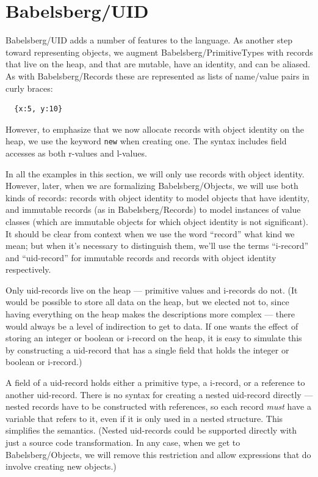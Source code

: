 \documentclass{article}
\newcommand{\Cuid}{\texttt{\upshape C}}
\newcommand{\Iuid}{\texttt{\upshape I}}
\newcommand{\Ccal}{$\mathbb{C}$}
\newcommand{\Ical}{$\mathbb{I}$}
\newcommand{\C}{\Ccal}
\renewcommand{\C}{\Ccal}
\newcommand{\I}{\Ical}
\newcounter{examples}
\begin{document}
\section{Babelsberg/UID}
\label{sec:babelsberg-uid}
\renewcommand{\C}{\Cuid}
\renewcommand{\I}{\Iuid}

Babelsberg/UID adds a number of features to the language. As another step
toward representing objects, we augment Babelsberg/PrimitiveTypes with
records that live on the heap, and that are mutable, have an identity,
and can be aliased.  As with Babelsberg/Records these are represented
as lists of name/value pairs in curly braces:

\begin{verbatim}
  {x:5, y:10}
\end{verbatim}

However, to emphasize that we now allocate records with object
identity on the heap, we use the keyword \verb|new| when creating
one. The syntax includes field accesses as both r-values and l-values.

In all the examples in this section, we will only use records with
object identity.  However, later, when we are formalizing
Babelsberg/Objects, we will use both kinds of records: records with
object identity to model objects that have identity, and immutable
records (as in Babelsberg/Records) to model instances of value classes
(which are immutable objects for which object identity is not
significant).  It should be clear from context when we use the word
``record'' what kind we mean; but when it's necessary to distinguish
them, we'll use the terms ``i-record'' and ``uid-record'' for
immutable records and records with object identity respectively.

Only uid-records live on the heap --- primitive values and i-records do
not.  (It would be possible to store all data on the heap, but we
elected not to, since having everything on the heap makes the
descriptions more complex --- there would always be a level of
indirection to get to data.  If one wants the effect of storing an
integer or boolean or i-record on the heap, it is easy to simulate
this by constructing a uid-record that has a single field that holds
the integer or boolean or i-record.)

A field of a uid-record holds either a primitive type, a i-record,
or a reference to another uid-record.  There is no syntax for creating
a nested uid-record directly --- nested records have to be constructed
with references, so each record \emph{must} have a variable that
refers to it, even if it is only used in a nested structure. This
simplifies the semantics.  (Nested uid-records could be supported
directly with just a source code transformation.  In any case, when we
get to Babelsberg/Objects, we will remove this restriction and allow
expressions that do involve creating new objects.)
\end{document}
